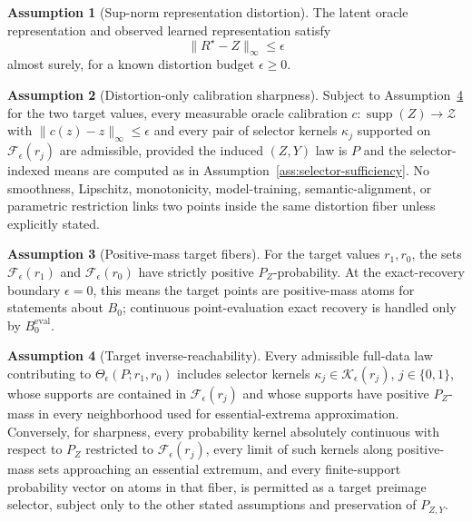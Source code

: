 \documentclass[11pt]{article}
\theoremstyle{definition}
\newtheorem{assumption}{Assumption}
\theoremstyle{plain}
\theoremstyle{remark}
\begin{document}
\begin{assumption}[Sup-norm representation distortion]\label{ass:distortion}
The latent oracle representation and observed learned representation satisfy
\[
\|R^\star-Z\|_\infty\le\epsilon
\]
almost surely, for a known distortion budget \(\epsilon\ge0\).
\end{assumption}

\begin{assumption}[Distortion-only calibration sharpness]\label{ass:distortion-sharpness}
Subject to Assumption~\ref{ass:target-reachability} for the two target values, every measurable oracle calibration \(c:\operatorname{supp}(Z)\to\mathcal Z\) with \(\|c(z)-z\|_\infty\le\epsilon\) and every pair of selector kernels \(\kappa_j\) supported on \(\mathcal F_\epsilon(r_j)\) are admissible, provided the induced \((Z,Y)\) law is \(P\) and the selector-indexed means are computed as in Assumption~\ref{ass:selector-sufficiency}.  No smoothness, Lipschitz, monotonicity, model-training, semantic-alignment, or parametric restriction links two points inside the same distortion fiber unless explicitly stated.
\end{assumption}

\begin{assumption}[Positive-mass target fibers]\label{ass:nonempty-fibers}
For the target values \(r_1,r_0\), the sets \(\mathcal F_\epsilon(r_1)\) and \(\mathcal F_\epsilon(r_0)\) have strictly positive \(P_Z\)-probability.  At the exact-recovery boundary \(\epsilon=0\), this means the target points are positive-mass atoms for statements about \(B_0\); continuous point-evaluation exact recovery is handled only by \(B^{\mathrm{eval}}_0\).
\end{assumption}

\begin{assumption}[Target inverse-reachability]\label{ass:target-reachability}
Every admissible full-data law contributing to \(\Theta_\epsilon(P;r_1,r_0)\) includes selector kernels \(\kappa_j\in\mathcal K_\epsilon(r_j)\), \(j\in\{0,1\}\), whose supports are contained in \(\mathcal F_\epsilon(r_j)\) and whose supports have positive \(P_Z\)-mass in every neighborhood used for essential-extrema approximation.  Conversely, for sharpness, every probability kernel absolutely continuous with respect to \(P_Z\) restricted to \(\mathcal F_\epsilon(r_j)\), every limit of such kernels along positive-mass sets approaching an essential extremum, and every finite-support probability vector on atoms in that fiber, is permitted as a target preimage selector, subject only to the other stated assumptions and preservation of \(P_{Z,Y}\).
\end{assumption}
\end{document}
